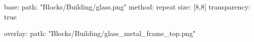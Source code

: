 base:
  path: "Blocks/Building/glass.png"
  method: repeat
  size: [8,8]
  transparency: true

overlay:
  path: "Blocks/Building/glass_metal_frame_top.png"